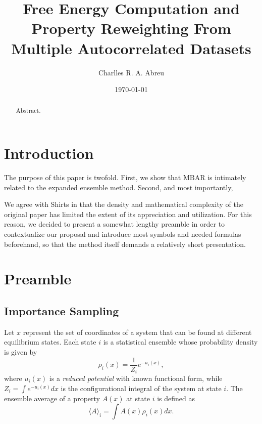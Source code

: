 \documentclass[aip,jcp,reprint,amsmath,amssymb]{revtex4-1}
\begin{document}
\title{Free Energy Computation and Property Reweighting From Multiple Autocorrelated Datasets}

\author{Charlles R. A. Abreu}

\date{\today}

\begin{abstract}
Abstract.
\end{abstract}

\maketitle

\section{Introduction}
\label{sec:introduction}

The purpose of this paper is twofold. First, we show that MBAR is intimately related to the expanded ensemble method. Second, and most importantly, 

We agree with Shirts\cite{Shirts_2017} in that the density and mathematical complexity of the original  paper has limited the extent of its appreciation and utilization. For this reason, we decided to present a somewhat lengthy preamble in order to contextualize our proposal and introduce most symbols and needed formulas beforehand, so that the method itself demands a relatively short presentation.

\section{Preamble}

\subsection{Importance Sampling}
\label{sec:definitions}

Let $x$ represent the set of coordinates of a system that can be found at different equilibrium states. Each state $i$ is a statistical ensemble whose probability density is given by
\begin{equation}
\label{eq:state_prob_density}
\rho_i(x) = \frac{1}{Z_i} e^{-u_i(x)},
\end{equation}
where $u_i(x)$ is a \textit{reduced potential}\cite{Shirts_2008, Chodera_2011} with known functional form, while $Z_i = \int e^{-u_i(x)}dx$ is the configurational integral of the system at state $i$. The ensemble average of a property $A(x)$ at state $i$ is defined as
\begin{equation}
\label{eq:ensemble average}
\langle A \rangle_i = \int A(x)\rho_i(x)dx.
\end{equation}
\end{document}
